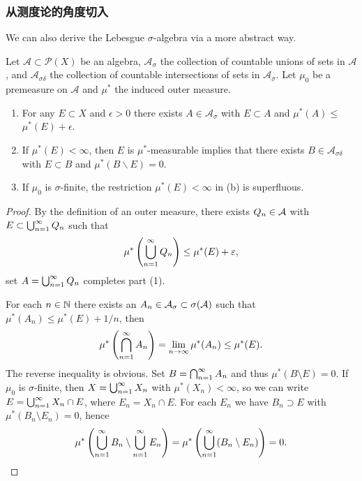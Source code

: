 \subsubsection*{从测度论的角度切入}
We can also derive the Lebesgue $\sigma$-algebra via a more abstract way. 

\begin{exercise}\label{ex1-22}
    Let $\mathcal{A} \subset \mathcal{P}(X)$ be an algebra, $\mathcal{A}_\sigma$ the collection of countable unions of sets in $\mathcal{A}$, and $\mathcal{A}_{\sigma \delta}$ the collection of countable intersections of sets in $\mathcal{A}_\sigma$. Let $\mu_0$ be a premeasure on $\mathcal{A}$ and $\mu^*$ the induced outer measure.
    \begin{enumerate}
    \item For any $E \subset X$ and $\epsilon>0$ there exists $A \in \mathcal{A}_\sigma$ with $E \subset A$ and $\mu^*(A) \leq$ $\mu^*(E)+\epsilon$.
    \item If $\mu^*(E)<\infty$, then $E$ is $\mu^*$-measurable implies that there exists $B \in \mathcal{A}_{\sigma \delta}$ with $E \subset B$ and $\mu^*(B \backslash E)=0$.
    \item If $\mu_0$ is $\sigma$-finite, the restriction $\mu^*(E)<\infty$ in (b) is superfluous. 
    \end{enumerate}
\end{exercise}
\begin{proof}
    By the definition of an outer measure, there exists $Q_n \in \mathcal{A}$ with $E \subset \bigcup_{n=1}^{\infty}Q_n$ such that 
    $$\mu^*\left(\bigcup_{n=1}^{\infty}Q_n\right) \leq \mu^*(E) + \varepsilon, $$
    set $A = \bigcup_{n=1}^{\infty}Q_n$ completes part (1). 

    For each $n \in \mathbb{N}$ there exists an $A_n \in \mathcal{A}_\sigma \subset \sigma(\mathcal{A})$ such that 
    $\mu^*(A_n) \leq \mu^*(E) + 1/n$,
    then 
    $$\mu^*\left(\bigcap_{n=1}^{\infty}A_n\right)
    = \lim_{n \to \infty}\mu^*(A_n) \leq \mu^*(E).$$
    The reverse inequality is obvious. Set $B = \bigcap_{n=1}^{\infty}A_n$ and thus $\mu^*(B \setminus E) = 0$. 
    If $\mu_0$ is $\sigma$-finite, then $X = \bigcup_{n=1}^{\infty}X_n$ with $\mu^*(X_n) < \infty$, so we can write 
    $E = \bigcup_{n=1}^{\infty}X_n \cap E$, where $E_n = X_n \cap E$. For each $E_n$ we have $B_n \supset E$ with $\mu^*(B_n \setminus E_n) = 0$, hence 
    $$\mu^*\left(\bigcup_{n=1}^{\infty}B_n \setminus \bigcup_{n=1}^{\infty}E_n\right) = 
    \mu^*\left(\bigcup_{n=1}^{\infty}(B_n \setminus E_n)\right) = 0.$$
\end{proof}

